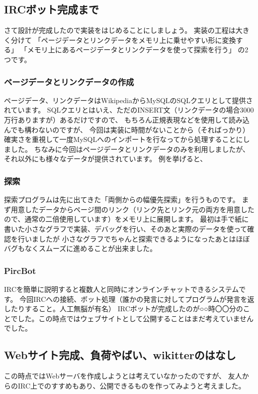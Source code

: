 \documentclass{jsarticle}
\begin{document}
\subsection{IRCボット完成まで}
さて設計が完成したので実装をはじめることにしましょう。
実装の工程は大きく分けて
「ページデータとリンクデータをメモリ上に乗せやすい形に変換する」
「メモリ上にあるページデータとリンクデータを使って探索を行う」
の2つです。

\subsubsection{ページデータとリンクデータの作成}
ページデータ、リンクデータはWikipediaからMySQLのSQLクエリとして提供されています。
SQLクエリとはいえ、ただのINSERT文（リンクデータの場合3000万行ありますが）あるだけですので、
もちろん正規表現などを使用して読み込んでも構わないのですが、
今回は実装に時間がないことから（そればっかり）確実さを重視して一度MySQLへのインポートを行なってから処理することにしました。
ちなみに今回はページデータとリンクデータのみを利用しましたが、それ以外にも様々なデータが提供されています。
例を挙げると、

\subsubsection{探索}
探索プログラムは先に出てきた「両側からの幅優先探索」を行うものです。
まず用意したデータからページ間のリンク（リンク先とリンク元の両方を用意したので、通常の二倍使用しています）をメモリ上に展開します。
最初は手で紙に書いた小さなグラフで実装、デバッグを行い、そのあと実際のデータを使って確認を行いましたが
小さなグラフでちゃんと探索できるようになったあとはほぼバグもなくスムーズに進めることが出来ました。
\subsubsection{PircBot}
IRCを簡単に説明すると複数人と同時にオンラインチャットできるシステムです。
今回IRCへの接続、ボット処理（誰かの発言に対してプログラムが発言を返したりすること。人工無脳が有名）
IRCボットが完成したのが○○時〇〇分のことでした。この時点ではウェブサイトとして公開することはまだ考えていませんでした。

\subsection{Webサイト完成、負荷やばい、wikitterのはなし}
この時点ではWebサーバを作成しようとは考えていなかったのですが、
友人からのIRC上でのすすめもあり、公開できるものを作ってみようと考えました。
\end{document}
